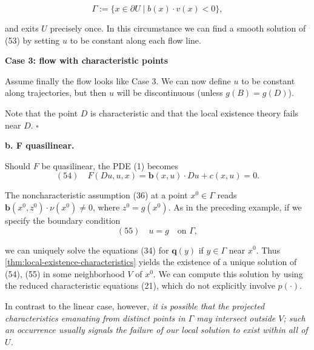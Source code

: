 \begin{example}
$$\Gamma := \{x \in \partial U \mid b(x) \cdot v(x) < 0\},$$

and exits $U$ precisely once. In this circumstance we can find a smooth solution of (53) by setting $u$ to be constant along each flow line.

\begin{figure}[h]\centering
\end{figure}

\noindent\textbf{Case 3: flow with characteristic points}

Assume finally the flow looks like Case 3. We can now define $u$ to be constant along trajectories, but then $u$ will be discontinuous (unless $g(B) = g(D)$).

Note that the point $D$ is characteristic and that the local existence theory fails near $D$. $\square$
\end{example}

\textbf{b. F quasilinear.}

Should $F$ be quasilinear, the PDE (1) becomes
$$(54) \quad F(Du, u, x) = \mathbf{b}(x,u) \cdot Du + c(x,u) = 0.$$

The noncharacteristic assumption (36) at a point $x^0 \in \Gamma$ reads $\mathbf{b}(x^0, z^0) \cdot \nu(x^0) \neq 0$, where $z^0 = g(x^0)$. As in the preceding example, if we specify the boundary condition
$$(55) \quad u = g \quad \text{on } \Gamma,$$

we can uniquely solve the equations (34) for $\mathbf{q}(y)$ if $y \in \Gamma$ near $x^0$. Thus \cref{thm:local-existence-characteristics} yields the existence of a unique solution of (54), (55) in some neighborhood $V$ of $x^0$. We can compute this solution by using the reduced characteristic equations (21), which do not explicitly involve $p(\cdot)$.

In contrast to the linear case, however, \textit{it is possible that the projected characteristics emanating from distinct points in $\Gamma$ may intersect outside $V$; such an occurrence usually signals the failure of our local solution to exist within all of $U$.}

